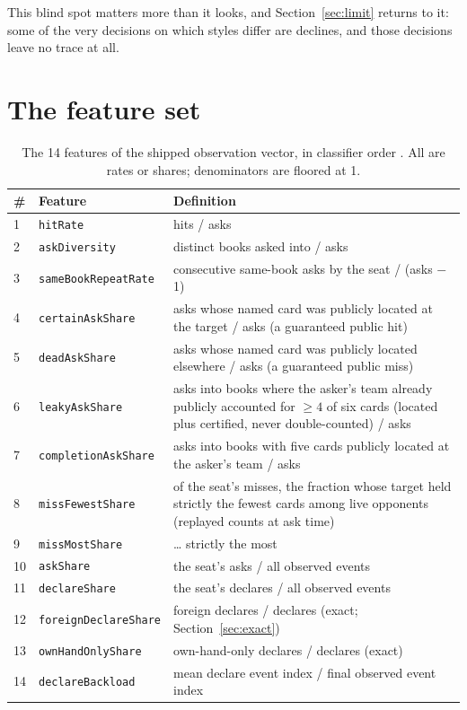 \documentclass[11pt]{article}
\newcommand{\code}[1]{\texttt{#1}}
\begin{document}
This blind spot matters more than it looks, and Section~\ref{sec:limit} returns to it: some
of the very decisions on which styles differ are declines, and those decisions leave no trace
at all.

\section{The feature set}
\label{sec:features}

\begin{table}[t]
\centering
\caption{The 14 features of the shipped observation vector, in classifier order
\cite{repo}. All are rates or shares; denominators are floored at 1.}
\label{tab:features}
\small
\begin{tabular}{@{}llp{8.0cm}@{}}
\toprule
\# & Feature & Definition \\
\midrule
1 & \code{hitRate} & hits / asks \\
2 & \code{askDiversity} & distinct books asked into / asks \\
3 & \code{sameBookRepeatRate} & consecutive same-book asks by the seat / (asks $-$ 1) \\
4 & \code{certainAskShare} & asks whose named card was publicly located at the target / asks
    (a guaranteed public hit) \\
5 & \code{deadAskShare} & asks whose named card was publicly located elsewhere / asks
    (a guaranteed public miss) \\
6 & \code{leakyAskShare} & asks into books where the asker's team already publicly accounted
    for $\geq 4$ of six cards (located plus certified, never double-counted) / asks \\
7 & \code{completionAskShare} & asks into books with five cards publicly located at the
    asker's team / asks \\
8 & \code{missFewestShare} & of the seat's misses, the fraction whose target held strictly
    the fewest cards among live opponents (replayed counts at ask time) \\
9 & \code{missMostShare} & \ldots{} strictly the most \\
10 & \code{askShare} & the seat's asks / all observed events \\
11 & \code{declareShare} & the seat's declares / all observed events \\
12 & \code{foreignDeclareShare} & foreign declares / declares (exact; Section~\ref{sec:exact}) \\
13 & \code{ownHandOnlyShare} & own-hand-only declares / declares (exact) \\
14 & \code{declareBackload} & mean declare event index / final observed event index \\
\bottomrule
\end{tabular}
\end{table}
\end{document}
